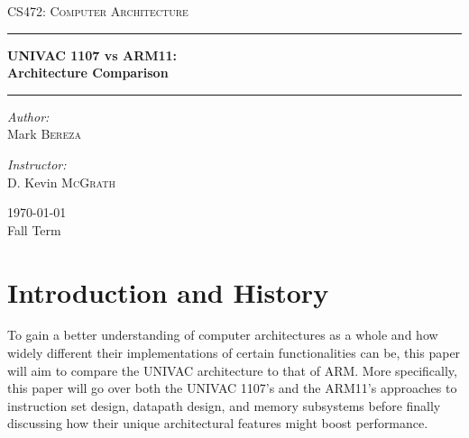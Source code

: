 \documentclass[onecolumn, draftclsnofoot, 10pt, compsoc]{IEEEtran}
\begin{document}
\begin{titlepage}
\begin{center}

\vspace*{50mm}

\textsc{\LARGE CS472: Computer Architecture}\\[1.5cm]

\hrule
\vspace{5mm}
{ \huge \bfseries UNIVAC 1107 vs ARM11:\\Architecture Comparison\\[0.9cm] }
\hrule 
\vspace{5mm}

\noindent
\begin{minipage}{0.4\textwidth}

\begin{flushleft} \large
\emph{Author:}\\
Mark \textsc{Bereza}
\end{flushleft}
\end{minipage}%
\begin{minipage}{0.4\textwidth}
\begin{flushright} \large
\emph{Instructor:} \\
D. Kevin \textsc{McGrath}
\end{flushright}

\end{minipage}

\vspace*{\fill}
{\large \today}\\
{\large Fall Term}

\end{center}
\end{titlepage}
  
\tableofcontents
\newpage
\renewcommand{\baselinestretch}{1.0}
\linespread{1.0}
\section{Introduction and History}
To gain a better understanding of computer architectures as a whole and how widely different their implementations of certain functionalities can be, this paper will aim to compare the UNIVAC architecture to that of ARM. More specifically, this paper will go over both the UNIVAC 1107's and the ARM11's approaches to instruction set design, datapath design, and memory subsystems before finally discussing how their unique architectural features might boost performance.
\end{document}
